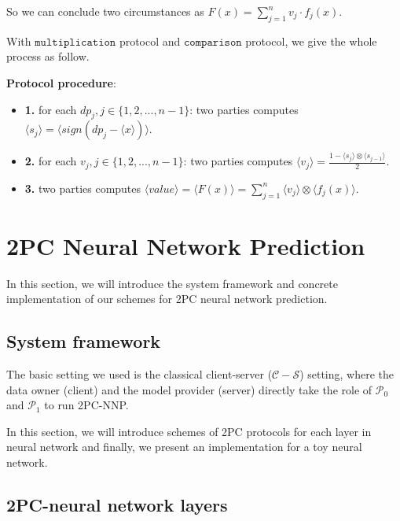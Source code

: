 \documentclass[letterpaper]{article} %
\begin{document}
       So we can conclude two circumstances as $F(x)=\sum_{j=1}^{n}v_{j}\cdot f_{j}(x)$.

       With $\mathtt{multiplication}$ protocol and $\mathtt{comparison}$ protocol, we give the whole process as follow.%


       \textbf{Protocol procedure}:

       \begin{itemize}
           \item \textbf{1.}
           for each $dp_{j},j\in\{1,2,...,n-1\}$:
           two parties computes $\langle s_{j}\rangle=\langle sign(dp_{j}-\langle x\rangle)\rangle$.

           \item \textbf{2.}
           for each $v_{j},j\in\{1,2,...,n-1\}$:
           two parties computes $\langle v_{j} \rangle= \frac{1-\langle s_{j}\rangle\otimes \langle s_{j-1}\rangle}{2}$.

           \item \textbf{3.}
           two parties computes $\langle value\rangle=\langle F(x)\rangle=\sum_{j=1}^{n}\langle v_{j}\rangle\otimes \langle f_{j}(x)\rangle$.
       \end{itemize}


    \section{2PC Neural Network Prediction}
       In this section, we will introduce the system framework and concrete implementation of our
       schemes for 2PC neural network prediction.

    \subsection{System framework}
       The basic setting we used is the classical client-server ($\mathcal{C}-\mathcal{S}$) setting,
       where the data owner (client) and the model provider (server)
       directly take the role of $\mathcal{P}_{0}$ and $\mathcal{P}_{1}$ to run 2PC-NNP.

       In this section, we will introduce schemes
       of 2PC protocols for each layer in neural network
       and finally, we present an implementation for a toy neural network.


    \subsection{2PC-neural network layers}
\end{document}
